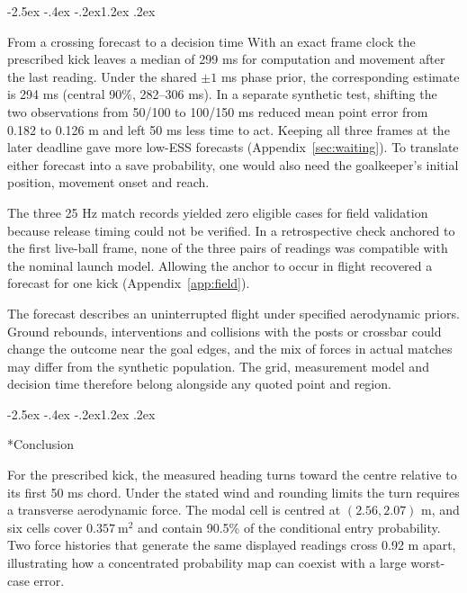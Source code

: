 \documentclass[11pt,letterpaper]{article}
\makeatletter
\renewcommand{\section}{\reserveheadroom\@startsection{section}{1}{\z@}
  {-2.5ex \@plus -.4ex \@minus -.2ex}{1.2ex \@plus .2ex}
  {\normalfont\Large\bfseries\color{black}\raggedright}}
\newcommand{\reserveheadroom}{\par\ifdim\dimexpr\pagegoal-\pagetotal\relax<5\baselineskip\newpage\fi}
\makeatother
\begin{document}
\reserveheadroom


\section{From a crossing forecast to a decision time}
With an exact frame clock the prescribed kick leaves a median of 299 ms for computation and movement after the last reading. Under the shared \(\pm1\) ms phase prior, the corresponding estimate is 294 ms (central 90\%, 282--306 ms). In a separate synthetic test, shifting the two observations from 50/100 to 100/150 ms reduced mean point error from 0.182 to 0.126 m and left 50 ms less time to act. Keeping all three frames at the later deadline gave more low-ESS forecasts (Appendix~\ref{sec:waiting}). To translate either forecast into a save probability, one would also need the goalkeeper's initial position, movement onset and reach.

The three 25 Hz match records yielded zero eligible cases for field validation because release timing could not be verified. In a retrospective check anchored to the first live-ball frame, none of the three pairs of readings was compatible with the nominal launch model. Allowing the anchor to occur in flight recovered a forecast for one kick (Appendix~\ref{app:field}).

The forecast describes an uninterrupted flight under specified aerodynamic priors. Ground rebounds, interventions and collisions with the posts or crossbar could change the outcome near the goal edges, and the mix of forces in actual matches may differ from the synthetic population. The grid, measurement model and decision time therefore belong alongside any quoted point and region.

\section*{Conclusion}
For the prescribed kick, the measured heading turns toward the centre relative to its first 50 ms chord. Under the stated wind and rounding limits the turn requires a transverse aerodynamic force. The modal cell is centred at \((2.56,2.07)\) m, and six cells cover \(0.357\ \mathrm{m^2}\) and contain 90.5\% of the conditional entry probability. Two force histories that generate the same displayed readings cross 0.92 m apart, illustrating how a concentrated probability map can coexist with a large worst-case error.
\end{document}
